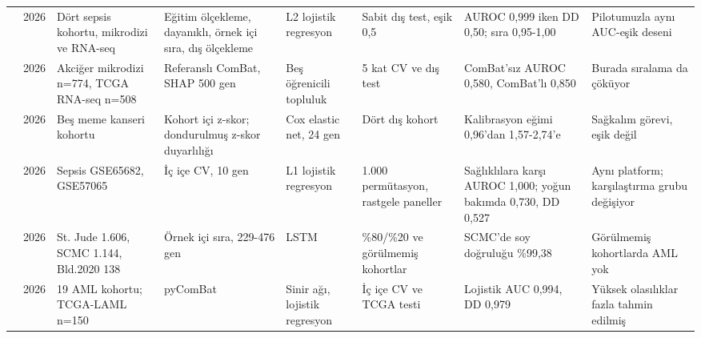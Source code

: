 \begin{longtable}{@{}p{0.9cm}p{0.5cm}p{2.3cm}p{2.6cm}p{2.6cm}p{2.3cm}p{2.6cm}p{2.4cm}@{}}
\cite{zheng2026} & 2026 & Dört sepsis kohortu, mikrodizi ve RNA-seq & Eğitim ölçekleme, dayanıklı, örnek içi sıra, dış ölçekleme & L2 lojistik regresyon & Sabit dış test, eşik 0,5 & AUROC 0,999 iken DD 0,50; sıra 0,95-1,00 & Pilotumuzla aynı AUC-eşik deseni\\
\cite{kervanci2026} & 2026 & Akciğer mikrodizi n=774, TCGA RNA-seq n=508 & Referanslı ComBat, SHAP 500 gen & Beş öğrenicili topluluk & 5 kat CV ve dış test & ComBat'sız AUROC 0,580, ComBat'lı 0,850 & Burada sıralama da çöküyor\\
\cite{botan2026} & 2026 & Beş meme kanseri kohortu & Kohort içi z-skor; dondurulmuş z-skor duyarlılığı & Cox elastic net, 24 gen & Dört dış kohort & Kalibrasyon eğimi 0,96'dan 1,57-2,74'e & Sağkalım görevi, eşik değil\\
\cite{kolev2026} & 2026 & Sepsis GSE65682, GSE57065 & İç içe CV, 10 gen & L1 lojistik regresyon & 1.000 permütasyon, rastgele paneller & Sağlıklılara karşı AUROC 1,000; yoğun bakımda 0,730, DD 0,527 & Aynı platform; karşılaştırma grubu değişiyor\\
\cite{cui2026} & 2026 & St. Jude 1.606, SCMC 1.144, Bld.2020 138 & Örnek içi sıra, 229-476 gen & LSTM & \%80/\%20 ve görülmemiş kohortlar & SCMC'de soy doğruluğu \%99,38 & Görülmemiş kohortlarda AML yok\\
\cite{jung2026} & 2026 & 19 AML kohortu; TCGA-LAML n=150 & pyComBat & Sinir ağı, lojistik regresyon & İç içe CV ve TCGA testi & Lojistik AUC 0,994, DD 0,979 & Yüksek olasılıklar fazla tahmin edilmiş\\
\bottomrule
\end{longtable}
